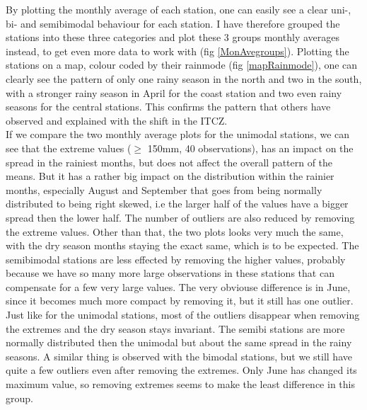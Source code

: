 \documentclass{article}
\begin{document}
	By plotting the monthly average of each station, one can easily see a clear uni-, bi- and semibimodal behaviour for each station. I have therefore grouped the stations into these three categories and plot these 3 groups monthly averages instead, to get even more data to work with (fig \ref{MonAvegroups}). Plotting the stations on a map, colour coded by their rainmode (fig \ref{mapRainmode}), one can clearly see the pattern of only one rainy season in the north and two in the south, with a stronger rainy season in April for the coast station and two even rainy seasons for the central stations. This confirms the pattern that others have observed and explained with the shift in the ITCZ.\\
	If we compare the two monthly average plots for the unimodal stations, we can see that the extreme values ($\geq$ 150mm, 40 observations), has an impact on the spread in the rainiest months, but does not affect the overall pattern of the means. But it has a rather big impact on the distribution within the rainier months, especially August and September that goes from being normally distributed to being right skewed, i.e the larger half of the values have a bigger spread then the lower half. The number of outliers are also reduced by removing the extreme values. Other than that, the two plots looks very much the same, with the dry season months staying the exact same, which is to be expected.
	The semibimodal stations are less effected by removing the higher values, probably because we have so many more large observations in these stations that can compensate for a few very large values. The very obviouse difference is in June, since it becomes much more compact by removing it, but it still has one outlier. Just like for the unimodal stations, most of the outliers disappear when removing the extremes and the dry season stays invariant. The semibi stations are more normally distributed then the unimodal but about the same spread in the rainy seasons. A similar thing is observed with the bimodal stations, but we still have quite a few outliers even after removing the extremes. Only June has changed its maximum value, so removing extremes seems to make the least difference in this group. 
\end{document}
